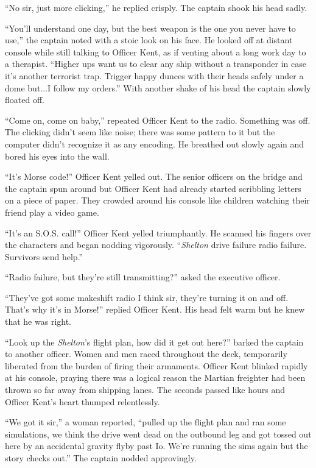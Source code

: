 \documentclass[openany, 12pt]{book} %
\begin{document}
``No sir, just more clicking,'' he replied crisply. The captain shook his head sadly.

``You'll understand one day, but the best weapon is the one you never have to use,'' the captain noted with a stoic look on his face. He looked off at distant console while still talking to Officer Kent, as if venting about a long work day to a therapist. ``Higher ups want us to clear any ship without a transponder in case it's another terrorist trap. Trigger happy dunces with their heads safely under a dome but...I follow my orders.'' With another shake of his head the captain slowly floated off.

``Come on, come on baby,'' repeated Officer Kent to the radio. Something was off. The clicking didn't seem like noise; there was some pattern to it but the computer didn't recognize it as any encoding. He breathed out slowly again and bored his eyes into the wall. 

``It's Morse code!'' Officer Kent yelled out. The senior officers on the bridge and the captain spun around but Officer Kent had already started scribbling letters on a piece of paper. They crowded around his console like children watching their friend play a video game.

``It's an S.O.S. call!'' Officer Kent yelled triumphantly. He scanned his fingers over the characters and began nodding vigorously. ``\textit{Shelton} drive failure radio failure. Survivors send help.''

``Radio failure, but they're still transmitting?'' asked the executive officer.

``They've got some makeshift radio I think sir, they're turning it on and off. That's why it's in Morse!'' replied Officer Kent. His head felt warm but he knew that he was right.

``Look up the \textit{Shelton}'s flight plan, how did it get out here?'' barked the captain to another officer. Women and men raced throughout the deck, temporarily liberated from the burden of firing their armaments. Officer Kent blinked rapidly at his console, praying there was a logical reason the Martian freighter had been thrown so far away from shipping lanes. The seconds passed like hours and Officer Kent's heart thumped relentlessly.

``We got it sir,'' a woman reported, ``pulled up the flight plan and ran some simulations, we think the drive went dead on the outbound leg and got tossed out here by an accidental gravity flyby past Io. We're running the sims again but the story checks out.'' The captain nodded approvingly.
\end{document}
